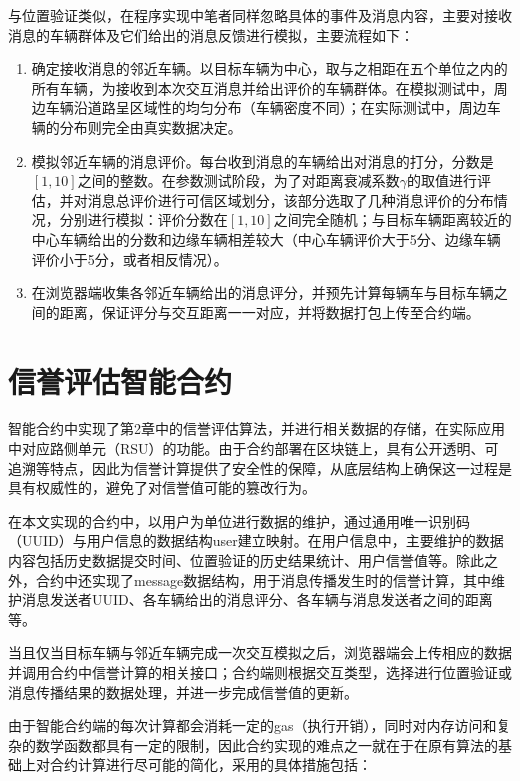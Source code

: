 与位置验证类似，在程序实现中笔者同样忽略具体的事件及消息内容，主要对接收消息的车辆群体及它们给出的消息反馈进行模拟，主要流程如下：
\begin{enumerate}
    \item 确定接收消息的邻近车辆。以目标车辆为中心，取与之相距在五个单位之内的所有车辆，为接收到本次交互消息并给出评价的车辆群体。在模拟测试中，周边车辆沿道路呈区域性的均匀分布（车辆密度不同）；在实际测试中，周边车辆的分布则完全由真实数据决定。
    \item 模拟邻近车辆的消息评价。每台收到消息的车辆给出对消息的打分，分数是$[1,10]$之间的整数。在参数测试阶段，为了对距离衰减系数$\gamma$的取值进行评估，并对消息总评价进行可信区域划分，该部分选取了几种消息评价的分布情况，分别进行模拟：评价分数在$[1,10]$之间完全随机；与目标车辆距离较近的中心车辆给出的分数和边缘车辆相差较大（中心车辆评价大于5分、边缘车辆评价小于5分，或者相反情况）。
    \item 在浏览器端收集各邻近车辆给出的消息评分，并预先计算每辆车与目标车辆之间的距离，保证评分与交互距离一一对应，并将数据打包上传至合约端。
\end{enumerate}

\section{信誉评估智能合约}

智能合约中实现了第2章中的信誉评估算法，并进行相关数据的存储，在实际应用中对应路侧单元（RSU）的功能。由于合约部署在区块链上，具有公开透明、可追溯等特点，因此为信誉计算提供了安全性的保障，从底层结构上确保这一过程是具有权威性的，避免了对信誉值可能的篡改行为。

在本文实现的合约中，以用户为单位进行数据的维护，通过通用唯一识别码（UUID）与用户信息的数据结构user建立映射。在用户信息中，主要维护的数据内容包括历史数据提交时间、位置验证的历史结果统计、用户信誉值等。除此之外，合约中还实现了message数据结构，用于消息传播发生时的信誉计算，其中维护消息发送者UUID、各车辆给出的消息评分、各车辆与消息发送者之间的距离等。

当且仅当目标车辆与邻近车辆完成一次交互模拟之后，浏览器端会上传相应的数据并调用合约中信誉计算的相关接口；合约端则根据交互类型，选择进行位置验证或消息传播结果的数据处理，并进一步完成信誉值的更新。

由于智能合约端的每次计算都会消耗一定的gas（执行开销），同时对内存访问和复杂的数学函数都具有一定的限制，因此合约实现的难点之一就在于在原有算法的基础上对合约计算进行尽可能的简化，采用的具体措施包括：

